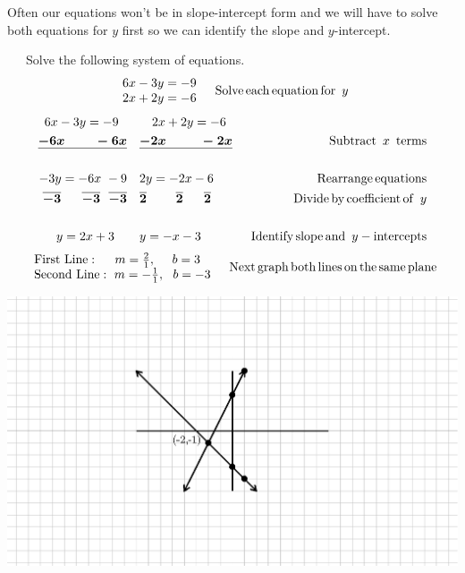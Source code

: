 Often our equations won't be in slope-intercept form and we will have to solve
both equations for $y$ first so we can identify the slope and $y$-intercept.

\begin{example}~~~Solve the following system of equations.
  \begin{eqnarray*}
    \begin{array}{l}
      6 x - 3 y = - 9\\
      2 x + 2 y = - 6
    \end{array} &  & \operatorname{Solve} \operatorname{each} \operatorname{equation} \operatorname{for~} y\\
	\end{eqnarray*}
	\begin{eqnarray*}
	6 x - 3 y = - 9~~ & ~~~~~~2 x + 2 y = - 6~~~ &\\
    \tmmathbf{\underline{- 6 x ~~~~~~~- 6 x}} & ~~~\tmmathbf{\underline{- 2 x ~~~~~~~~- 2 x}} &  \tmop{Subtract~} x
    \tmop{~terms}\\
    &  & \\
		- 3 y = - 6 x ~- 9 & ~~~2 y = - 2 x - 6 & \tmop{Rearrange} \tmop{equations}\\
    \tmmathbf{\overline{- 3} ~~~~~ \overline{- 3} ~~ \overline{- 3}} & ~~~\tmmathbf{\overline{2} ~~~~~~~ \overline{2} ~~~~~ \overline{2}} & \tmop{Divide} \tmop{by} \tmop{coefficient} \tmop{of~}
    y\\
		&  & \\
    y = 2 x + 3~~~ & ~~~y = - x - 3 &\tmop{Identify} \tmop{slope} \tmop{and~} y -
    \tmop{intercepts}%
	\end{eqnarray*}
	\begin{eqnarray*}
    \begin{array}{l}
			\operatorname{First~Line} : ~~~~m = \frac{2}{1}, ~~~~b = 3\\
      \operatorname{Second~Line} : ~m = - \frac{1}{1}, ~~b = - 3
    \end{array} &  & \operatorname{Next} \operatorname{graph} \operatorname{both}
    \operatorname{lines} \operatorname{on} \operatorname{the} \operatorname{same} \operatorname{plane}\\
  \end{eqnarray*}
  \begin{multicols}{2}
    \includegraphics[scale=.85,bb = 115 65 310 190, clip=true]{II_2_1-2.eps}
    

\end{multicols}
\end{example}
